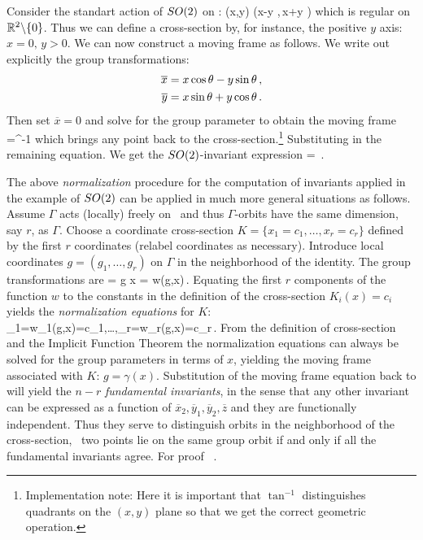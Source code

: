 \begin{example}
Consider the standart action of $SO(2)$ on :
\beq
	(x,y) \mapsto (x\cos\theta -y \sin\theta,\,x\sin\theta +y \cos\theta )
\eeq
which is regular on $\mathbb{R}^{2}\backslash\{0\}$. Thus we can define
a cross-section by, for instance, the
positive $y$ axis: $x=0,\,y>0$.
We can now construct a moving frame as follows. We write out
explicitly the group transformations:
\begin{subequations}
\begin{align}
 	\overline{x} &= x \cos\theta - y \sin\theta\label{eq:explSO2stnd1}\,, \\ 
	\overline{y} &= x \sin\theta + y \cos\theta\label{eq:explSO2stnd2}\,.
\end{align}
\end{subequations}
Then set $\overline{x}=0$ and solve  for the group
parameter to obtain the moving frame
\beq
	\theta=\tan^{-1}
	\label{eq:SO2stndMF}
\eeq
which brings any point  back to the cross-section.\footnote{Implementation note: Here it is important that $\tan^{-1}$
distinguishes quadrants on the $(x,y)$ plane so that we get the correct geometric operation.} Substituting  in the remaining equation. We get
the $SO(2)$-invariant expression
\beq
	 = \,.
\eeq
\end{example}

The above \emph{normalization} procedure for the computation of
invariants applied in the example of $SO(2)$ can be applied
in much more general situations as follows. Assume $\Gamma$
acts (locally) freely on \Manif\  and thus $\Gamma$-orbits
have the same dimension, say $r$, as $\Gamma$.  Choose a
coordinate cross-section $K=\{x_1=c_1,\ldots,x_r=c_r\}$ defined
by the first $r$ coordinates (relabel coordinates as
necessary). Introduce local coordinates $g=(g_1,\ldots,g_r)$ on
$\Gamma$ in the neighborhood of the identity.
The group transformations are
\beq
	= g \cdot x = w(g,x)\,.
	\label{eq:transNorm}
\eeq
Equating the first $r$ components of the function $w$ to the constants in the definition
of the cross-section $K_i(x)=c_i$ yields the \emph{normalization equations} for $K$:
\beq
	_1=w_1(g,x)=c_1,\ldots,_r=w_r(g,x)=c_r\,.
	\label{eq:normalization}
\eeq
From the definition of cross-section and the Implicit Function Theorem the normalization equations
 can always be solved for the group parameters in terms of $x$,
yielding the moving frame associated with $K$: $g=\gamma(x)$. Substitution
of the moving frame equation back to  will yield the $n-r$
\emph{fundamental invariants}, in the sense that any other invariant can be expressed
as a function of $\overline{x}_2,\overline{y}_1, \overline{y}_2,\overline{z}$ and they are functionally independent.
Thus they serve to distinguish orbits in the neighborhood of the cross-section, \ie~two points lie on the same group
orbit if and only if all the fundamental invariants agree. For proof \cf~.

